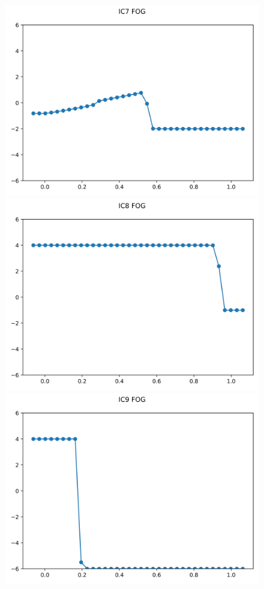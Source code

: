\documentclass{article}
\begin{document}
\begin{figure}[t]
        \centering
        \includegraphics[width=.95\textwidth]{../../code/IC7Methodfu_plot.png}
        \includegraphics[width=.95\textwidth]{../../code/IC8Methodfu_plot.png}
        \includegraphics[width=.95\textwidth]{../../code/IC9Methodfu_plot.png}

\end{figure}
\end{document}
